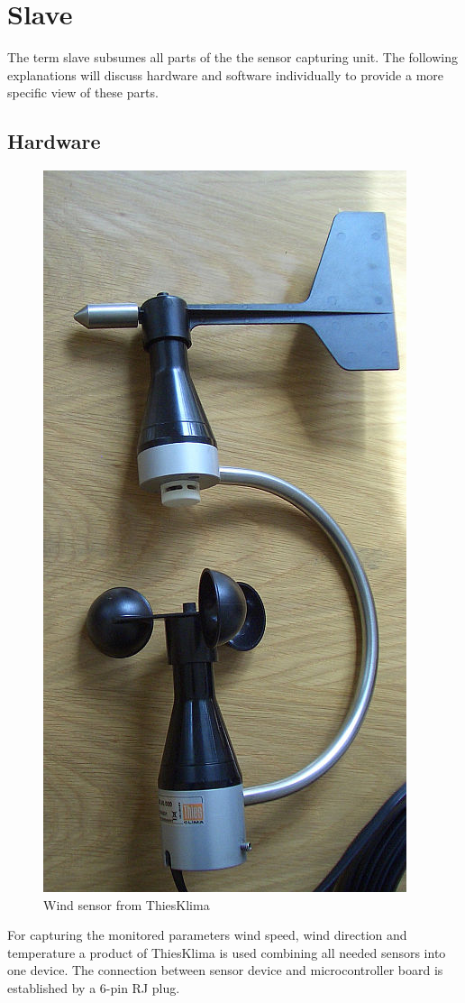
\chapter{Slave}

The term slave subsumes all parts of the the sensor capturing unit.
The following explanations will discuss hardware and software individually to provide a more specific view of these parts.

\section{Hardware}

\begin{figure}[ht]
    \centering
    \includegraphics[width=0.6\linewidth]{graphics/windsensor.jpg}
    \caption{Wind sensor from ThiesKlima}
    \label{fig:windsensor}
\end{figure}

For capturing the monitored parameters wind speed, wind direction and temperature a product of ThiesKlima is used combining all needed sensors into one device. The connection between sensor device and microcontroller board is established by a 6-pin RJ plug.

